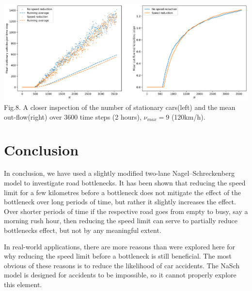 \documentclass[11pt]{article}
\begin{document}
	\begin{center}
		\includegraphics[scale=0.46]{Figures/Speedlimit_bottleneck_vmax7_zoomed.png}\\
		Fig.8.	
		A closer inspection of the number of stationary cars(left) and the mean out-flow(right) over 3600 time steps (2 hours), $\nu_{max}=9$ (120km/h). \\
	\end{center}
	
	\section{Conclusion}\label{sec:conclusion}
	
	In conclusion, we have used a slightly modified two-lane Nagel--Schreckenberg model to investigate road bottlenecks. It has been shown that reducing the speed limit for a few kilometres before a bottleneck does not mitigate the effect of the bottleneck over long periods of time, but rather it slightly increases the effect. Over shorter periods of time if the respective road goes from empty to busy, say a morning rush hour, then reducing the speed limit can serve to partially reduce bottlenecks effect, but not by any meaningful extent.
	
	In real-world applications, there are more reasons than were explored here for why reducing the speed limit before a bottleneck is still beneficial. The most obvious of these reasons is to reduce the likelihood of car accidents. The NaSch model is designed for accidents to be impossible, so it cannot properly explore this element.
	
	\newpage
	
	
	
	
\end{document}
